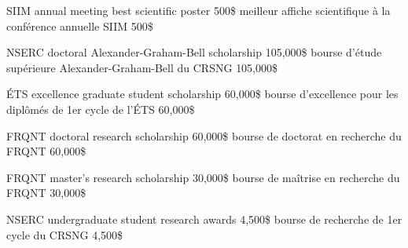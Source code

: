 \documentclass[print]{friggeri-cv}
\begin{document}

\begin{entrylist}
  \engfr
  { {{\small SIIM} annual meeting best scientific poster} {500\$} {\vspace{-3mm}}}
  { {meilleur affiche scientifique à la conférence annuelle {\small SIIM}} {500\$} {\vspace{-3mm}}}

  \engfr
  { {{\small NSERC} doctoral Alexander-Graham-Bell scholarship} {105,000\$} {\vspace{-3mm}}}
  { {bourse d’étude supérieure Alexander-Graham-Bell du {\small CRSNG}} {105,000\$} {\vspace{-3mm}}}

  \engfr
  { {{\small ÉTS} excellence graduate student scholarship} {60,000\$} {\vspace{-3mm}}}
  { {bourse d'excellence pour les diplômés de 1er cycle de l'ÉTS} {60,000\$} {\vspace{-3mm}}}

  \engfr
  { {{\small FRQNT} doctoral research scholarship} {60,000\$} {\vspace{-3mm}}}
  { {bourse de doctorat en recherche du {\small FRQNT}} {60,000\$} {\vspace{-3mm}}}

  \engfr
  { {{\small FRQNT} master's research scholarship} {30,000\$} {\vspace{-3mm}}}
  { {bourse de maîtrise en recherche du {\small FRQNT}} {30,000\$} {\vspace{-3mm}}}

  \engfr
  { {{\small NSERC} undergraduate student research awards} {4,500\$} {\vspace{-3mm}}}
  { {bourse de recherche de 1er cycle du {\small CRSNG}} {4,500\$} {\vspace{-3mm}}}
\end{entrylist}
\end{document}
